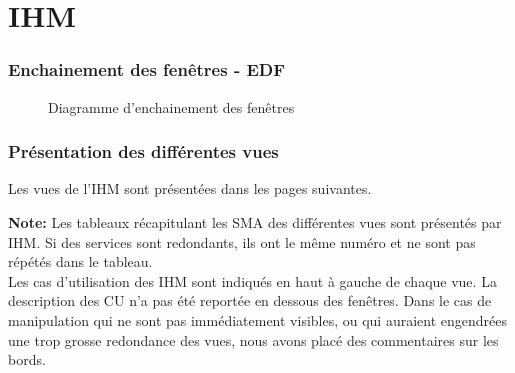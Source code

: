 \part{IHM}
\setcounter{section}{0}

\section{Enchainement des fenêtres - EDF}

\begin{figure}[H]
\noindent{}
\caption{Diagramme d'enchainement des fenêtres}
\end{figure}

\section{Présentation des différentes vues}
Les vues de l'IHM sont présentées dans les pages suivantes.

\begin{shaded}
\textbf{Note: } Les tableaux récapitulant les SMA des différentes vues sont présentés par IHM. Si des services sont redondants, ils ont le même numéro et ne sont pas répétés dans le tableau. \\

Les cas d'utilisation des IHM sont indiqués en haut à gauche de chaque vue. La description des CU n'a pas été reportée en dessous des fenêtres. Dans le cas de manipulation qui ne sont pas immédiatement visibles, ou qui auraient engendrées une trop grosse redondance des vues, nous avons placé des commentaires sur les bords.
\end{shaded}

